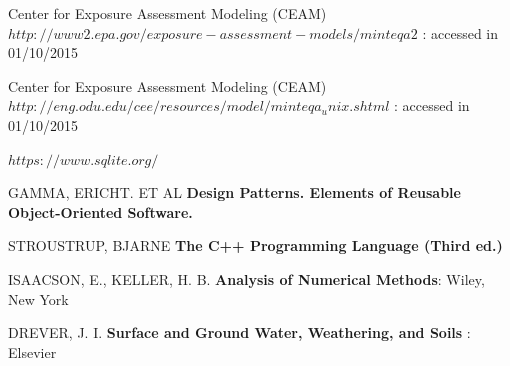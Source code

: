 \documentclass[ppgc,mestrado,english]{iiufrgs}
\begin{document}
\begin{thebibliography}{este-parametro-nao-eh-usado-pelo-estilo-ABNT}
 Center for Exposure Assessment Modeling (CEAM)
\textbf{ $http://www2.epa.gov/exposure-assessment-models/minteqa2$ } : accessed in 01/10/2015

 Center for Exposure Assessment Modeling (CEAM)
\textbf{ $http://eng.odu.edu/cee/resources/model/minteqa_unix.shtml$ } : accessed in 01/10/2015

\textbf{ $ https://www.sqlite.org/ $ }

 GAMMA, ERICHT. ET AL
\textbf{Design Patterns. Elements of Reusable Object-Oriented Software.}

 STROUSTRUP, BJARNE
\textbf{The C++ Programming Language (Third ed.)}

 ISAACSON, E., KELLER, H. B.
\textbf{Analysis of Numerical Methods}: Wiley, New York 

 DREVER, J. I.
\textbf{Surface and Ground Water, Weathering, and Soils} : Elsevier

\end{thebibliography}
\end{document}
